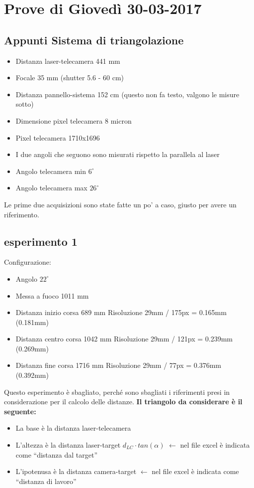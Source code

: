 \newpage
\section{Prove di Giovedì 30-03-2017}

\subsection{Appunti Sistema di triangolazione}
\begin{itemize}
  \item Distanza laser-telecamera	441 mm
  \item Focale				 35 mm		(shutter 5.6 - 60 cm)
  \item Distanza pannello-sistema	152 cm (questo non fa testo, valgono le misure sotto)
  \item Dimensione pixel telecamera	  8 micron
  \item Pixel telecamera		1710x1696
  
  \item I due angoli che seguono sono misurati rispetto la parallela al laser
  \item Angolo telecamera min $6^\circ$
  \item Angolo telecamera max $26^\circ$
\end{itemize}
Le prime due acquisizioni sono state fatte un po' a caso, giusto per avere un riferimento.

\subsection{esperimento 1}
Configurazione:
\begin{itemize}
  \item Angolo $22^\circ$
  \item Messa a fuoco		1011 mm
  \item Distanza inizio corsa	 689 mm		Risoluzione 29mm / 175px = 0.165mm (0.181mm)
  \item Distanza centro corsa	1042 mm		Risoluzione 29mm / 121px = 0.239mm (0.269mm)
  \item Distanza fine corsa	1716 mm		Risoluzione 29mm /  77px = 0.376mm (0.392mm)
\end{itemize}
Questo esperimento è sbagliato, perché sono sbagliati i riferimenti presi in considerazione per il calcolo delle distanze. \textbf{Il triangolo da considerare è il seguente:}
\begin{itemize}
  \item La base è la distanza laser-telecamera
  \item L'altezza è la distanza laser-target $d_{LC} \cdot tan(\alpha)$ $\leftarrow$ nel file excel è indicata come ``distanza dal target''
  \item L'ipotenusa è la distanza camera-target $\leftarrow$ nel file excel è indicata come ``distanza di lavoro''
\end{itemize}

